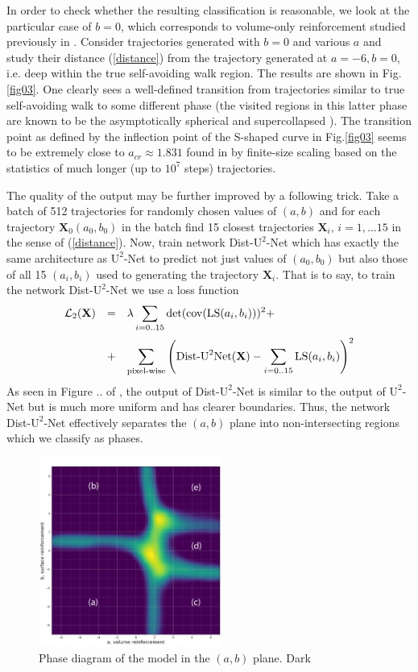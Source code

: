 \documentclass[aps,a4paper,twocolumn,showpacs]{revtex4}
\newcommand{\eq}[1]{(\ref{#1})}
\newcommand{\fig}[1]{Fig.\ref{#1}}
\newcommand{\be}{\begin{equation}}
\newcommand{\ee}{\end{equation}}
\newcommand{\ve}{\mathbf}
\begin{document}
In order to check whether the resulting classification is reasonable, we look at the particular case of $b=0$, which corresponds to volume-only reinforcement studied previously in \cite{sapozhnikov, ordemann1, ordemann2,foster}. Consider trajectories generated with $b=0$ and various $a$ and study their distance \eq{distance} from the trajectory generated at $a=-6,b=0$, i.e. deep within the true self-avoiding walk \cite{amit_parisi_peliti83} region. The results are shown in \fig{fig03}. One clearly sees a well-defined transition from trajectories similar to true self-avoiding walk to some different phase (the visited regions in this latter phase are known to be the asymptotically spherical and supercollapsed \cite{sapozhnikov, ordemann1}). The transition point as defined by the inflection point of the S-shaped curve in \fig{fig03} seems to be extremely close to $a_{cr} \approx 1.831$ found in  \cite{ordemann1} by finite-size scaling based on the statistics of much longer (up to $10^7$ steps) trajectories.   

The quality of the output may be further improved by a following trick.  Take a batch of 512 trajectories for randomly chosen values of $(a,b)$ and for each trajectory $\ve X_0 (a_0,b_0)$ in the batch find 15 closest trajectories $\ve X_i, \, i=1,\dots 15$ in the sense of \eq{distance}. Now, train network Dist-$\text{U}^{2}$-Net which has exactly the same architecture as $\text{U}^{2}$-Net to predict not just values of $(a_0,b_0)$ but also those of all 15 $(a_i,b_i)$ used to generating the trajectory $\ve X_i$. That is to say, to train the network Dist-$\text{U}^{2}$-Net we use a loss function  
\be
\begin{array}{rll}
 \mathcal{L}_2(\ve X) & = & \displaystyle \lambda \sum_{i=0..15} \det(\text{cov}(\text{LS}(a_i,b_i)))^{2} + \medskip \\
& + & \displaystyle \sum_{\text{pixel-wise}} \left(\text{Dist-U}^{2}\text{Net}(\ve X)- \sum_{i=0..15}\text{LS}(a_i,b_i)\right)^{2}
\end{array}
\label{loss}
\ee
As seen in Figure .. of \cite{supp}, the output of Dist-$\text{U}^{2}$-Net is similar to the output of $\text{U}^{2}$-Net but is much more uniform and has clearer boundaries. Thus, the network Dist-$\text{U}^{2}$-Net effectively separates the $(a,b)$ plane into non-intersecting regions which we classify as phases.   

\begin{figure}[ht]
\includegraphics[width=6cm]{Fig4_pd.png}
\caption{Phase diagram of the model in the $(a,b)$ plane. Dark}
\label{fig04}
\end{figure}
\end{document}
